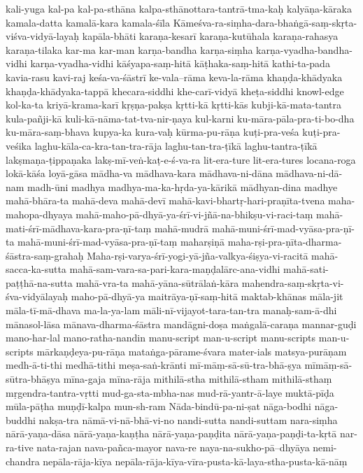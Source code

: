 {kali-yuga
kal-pa
kal-pa-sthāna
    kalpa-sthānottara-tantrā-tma-kaḥ 
kalyāṇa-kāraka
kamala-datta
kamalā-kara
    kamala-śīla 
Kāmeśva-ra-siṃha-dara-bhaṅgā-saṃ-skṛta-viśva-vidyā-layaḥ
kapāla-bhāti
karaṇa-kesarī
karaṇa-kutūhala
karaṇa-rahasya
karaṇa-tilaka
kar-ma
kar-man
karṇa-bandha
karṇa-siṃha
karṇa-vyadha-bandha-vidhi
karṇa-vyadha-vidhi
kāśyapa-saṃ-hitā
kāṭhaka-saṃ-hitā
kathi-ta-pada
kavia-rasu
kavi-raj
keśa-va-śāstrī
ke-vala--rāma
keva-la-rāma
khaṇḍa-khādyaka
khaṇḍa-khādyaka-tappā
khecara-siddhi
khe-carī-vidyā
kheṭa-siddhi
knowl-edge
kol-ka-ta
kriyā-krama-karī
kṛṣṇa-pakṣa
kṛtti-kā
kṛtti-kās
kubji-kā-mata-tantra
kula-pañji-kā
    kuli-kā-nāma-tat-tva-nir-ṇaya
kul-karni
ku-māra-pāla-pra-ti-bo-dha
ku-māra-saṃ-bhava
kupya-ka
    kura-vaḥ
    kūrma-pu-rāṇa 
kuṭi-pra-veśa
kuṭi-pra-veśika
    laghu-kāla-ca-kra-tan-tra-rāja
    laghu-tan-tra-ṭīkā
laghu-tantra-ṭīkā
lakṣmaṇa-ṭippaṇaka
lakṣ-mī-veṅ-kaṭ-e-ś-va-ra
lit-era-ture
lit-era-tures
locana-roga
lokā-kāśa
loyā-gāsa
mādha-va
mādhava-kara
mādhava-ni-dāna
mādhava-ni-dā-nam
madh-ūni
madhya
    madhya-ma-ka-hṛda-ya-kārikā
mādhyan-dina
madhye
mahā-bhāra-ta
mahā-deva
mahā-devī
mahā-kavi-bhartṛ-hari-praṇīta-tvena
maha-mahopa-dhyaya
mahā-maho-pā-dhyā-ya-śrī-vi-jñā-na-bhikṣu-vi-raci-taṃ
mahā-mati-śrī-mādhava-kara-pra-ṇī-taṃ
mahā-mudrā
mahā-muni-śrī-mad-vyāsa-pra-ṇī-ta
mahā-muni-śrī-mad-vyāsa-pra-ṇī-taṃ
maharṣiṇā
maha-rṣi-pra-ṇīta-dharma-śāstra-saṃ-grahaḥ
Maha-rṣi-varya-śrī-yogi-yā-jña-valkya-śiṣya-vi-racitā
mahā-sacca-ka-sutta
    mahā-sam-vara-sa-pari-kara-maṇḍalārc-ana-vidhi
mahā-sati-paṭṭhā-na-sutta
mahā-vra-ta
mahā-yāna-sūtrālaṅ-kāra
mahendra-saṃ-skṛta-vi-śva-vidyālayaḥ
    maho-pā-dhyā-ya 
maitrāya-ṇī-saṃ-hitā
maktab-khānas
māla-jit
    māla-tī-mā-dhava
    ma-la-ya-lam
māli-nī-vijayot-tara-tan-tra
manaḥ-sam-ā-dhi
mānasol-lāsa
mānava-dharma-śāstra
mandāgni-doṣa
maṅgalā-caraṇa
mannar-guḍi
mano-har-lal
mano-ratha-nandin
    manu-script
man-u-script
    manu-scripts
man-u-scripts
    mārkaṇḍeya-pu-rāṇa 
mataṅga-pārame-śvara
mater-ials
matsya-purāṇam
medh-ā-ti-thi
medhā-tithi
meṣa-saṅ-krānti
    mī-māṃ-sā-sū-tra-bhā-ṣya
    mīmāṃ-sā-sūtra-bhāṣya
    mīna-gaja
mīna-rāja
mithilā-stha
mithilā-stham
mithilā-sthaṃ
mṛgendra-tantra-vṛtti
    mud-ga-sta-mbha-nas
mud-rā-yantr-ā-laye
muktā-pīḍa
mūla-pāṭha
muṇḍī-kalpa
mun-sh-ram
Nāda-bindū-pa-ni-ṣat
nāga-bodhi
nāga-buddhi
nakṣa-tra
    nāmā-vi-nā-bhā-vi-no
nandi-sutta
nandi-suttam
nara-siṃha
nārā-yaṇa-dāsa
nārā-yaṇa-kaṇṭha
nārā-yaṇa-paṇḍita
nārā-yaṇa-paṇḍi-ta-kṛtā
nar-ra-tive
nata-rajan
nava-pañca-mayor
nava-re
naya-na-sukho-pā--dhyāya
nemi-chandra
    nepāla-rāja-kīya 
    nepāla-rāja-kīya-vīra-pusta-kā-laya-stha-pusta-kā-nāṃ
}
